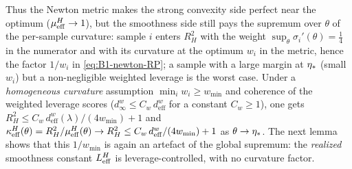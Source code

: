 Thus the Newton metric makes the strong convexity side perfect near the optimum ($\mu_{\mathrm{eff}}^H\to1$), but the
smoothness side still pays the supremum over $\theta$ of the per-sample curvature: sample $i$ enters
$R_H^2$ with the weight $\sup_\theta\sigma_i'(\theta)=\frac14$ in the numerator and with its curvature at
the optimum $w_i$ in the metric, hence the factor $1/w_i$ in \eqref{eq:B1-newton-RP}; a sample with a large
margin at $\eta_\ast$ (small $w_i$) but a non-negligible weighted leverage is the worst case. Under a
\emph{homogeneous curvature} assumption $\min_iw_i\ge w_{\min}$ and coherence of the weighted leverage
scores ($d^w_\infty\le C_w\,d^w_{\mathrm{eff}}$ for a constant $C_w\ge1$), one gets
$R_H^2\le C_w\,d^w_{\mathrm{eff}}(\lambda)/(4w_{\min})+1$
and $\kappa_{\mathrm{eff}}^H(\theta)=R_H^2/\mu_{\mathrm{eff}}^H(\theta)\to R_H^2\le C_w\,d^w_{\mathrm{eff}}/(4w_{\min})+1$
as $\theta\to\eta_\ast$. The next lemma shows that this $1/w_{\min}$ is again an artefact of the global
supremum: the \emph{realized} smoothness constant $L_{\mathrm{eff}}^H$ is leverage-controlled, with no curvature factor.

